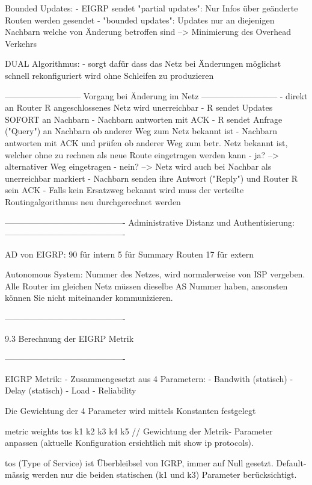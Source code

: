 \documentclass[11pt,a4paper]{article}
\begin{document}
Bounded Updates:
- EIGRP sendet "partial updates": Nur Infos über geänderte Routen 
werden gesendet
- "bounded updates": Updates nur an diejenigen Nachbarn welche von 
Änderung betroffen sind
--> Minimierung des Overhead Verkehrs

DUAL Algorithmus:
- sorgt dafür dass das Netz bei Änderungen möglichst schnell 
rekonfiguriert wird ohne Schleifen zu produzieren

---------------------------
Vorgang bei Änderung im Netz
---------------------------
- direkt an Router R angeschlossenes Netz wird unerreichbar
- R sendet Updates SOFORT an Nachbarn
- Nachbarn antworten mit ACK
- R sendet Anfrage ("Query") an Nachbarn ob anderer Weg zum Netz 
bekannt ist
- Nachbarn antworten mit ACK und prüfen ob anderer Weg zum betr. 
Netz bekannt ist, welcher ohne zu rechnen als neue Route 
eingetragen werden kann
	- ja? --> alternativer Weg eingetragen
	- nein? --> Netz wird auch bei Nachbar als unerreichbar 
markiert
- Nachbarn senden ihre Antwort ("Reply") und Router R sein ACK
- Falls kein Ersatzweg bekannt wird muss der verteilte 
Routingalgorithmus neu durchgerechnet werden

-------------------------------------------
Administrative Distanz und Authentisierung:
-------------------------------------------

AD von EIGRP:	90 für intern
		5 für Summary Routen
		17 für extern
		
Autonomous System:
Nummer des Netzes, wird normalerweise von ISP vergeben.
Alle Router im gleichen Netz müssen dieselbe AS Nummer haben, 
ansonsten können Sie nicht miteinander kommunizieren.


-------------------------------------------

	9.3 Berechnung der EIGRP Metrik

-------------------------------------------

EIGRP Metrik:
- Zusammengesetzt aus 4 Parametern:
	- Bandwith (statisch)
	- Delay (statisch)
	- Load
	- Reliability

Die Gewichtung der 4 Parameter wird mittels Konstanten festgelegt

metric weights tos k1 k2 k3 k4 k5	// Gewichtung der Metrik-
Parameter anpassen (aktuelle Konfiguration ersichtlich mit show 
ip protocols).

tos (Type of Service) ist Überbleibsel von IGRP, immer auf Null 
gesetzt.
Default-mässig werden nur die beiden statischen (k1 und k3) 
Parameter berücksichtigt.
\end{document}
